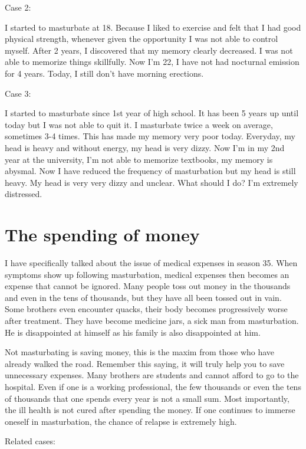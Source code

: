 \documentclass[
]{book}
\begin{document}
Case 2:

I started to masturbate at 18. Because I liked to exercise and felt that I had good physical strength, whenever given the opportunity I was not able to control myself. After 2 years, I discovered that my memory clearly decreased. I was not able to memorize things skillfully. Now I'm 22, I have not had nocturnal emission for 4 years. Today, I still don't have morning erections.

Case 3:

I started to masturbate since 1st year of high school. It has been 5 years up until today but I was not able to quit it. I masturbate twice a week on average, sometimes 3-4 times. This has made my memory very poor today. Everyday, my head is heavy and without energy, my head is very dizzy. Now I'm in my 2nd year at the university, I'm not able to memorize textbooks, my memory is abysmal. Now I have reduced the frequency of masturbation but my head is still heavy. My head is very very dizzy and unclear. What should I do? I'm extremely distressed.

\hypertarget{the-spending-of-money}{%
\section{The spending of money}\label{the-spending-of-money}}

I have specifically talked about the issue of medical expenses in season 35. When symptoms show up following masturbation, medical expenses then becomes an expense that cannot be ignored. Many people toss out money in the thousands and even in the tens of thousands, but they have all been tossed out in vain. Some brothers even encounter quacks, their body becomes progressively worse after treatment. They have become medicine jars, a sick man from masturbation. He is disappointed at himself as his family is also disappointed at him.

Not masturbating is saving money, this is the maxim from those who have already walked the road. Remember this saying, it will truly help you to save unnecessary expenses. Many brothers are students and cannot afford to go to the hospital. Even if one is a working professional, the few thousands or even the tens of thousands that one spends every year is not a small sum. Most importantly, the ill health is not cured after spending the money. If one continues to immerse oneself in masturbation, the chance of relapse is extremely high.

Related cases:
\end{document}
